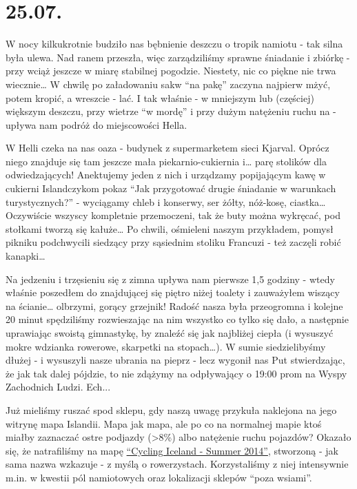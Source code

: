 \chapter{25.07.}

W nocy kilkukrotnie budziło nas bębnienie deszczu o tropik namiotu - tak silna była ulewa. Nad ranem przeszła, więc zarządziliśmy sprawne śniadanie i zbiórkę - przy wciąż jeszcze w miarę stabilnej pogodzie. Niestety, nic co piękne nie trwa wiecznie… W chwilę po załadowaniu sakw “na pakę” zaczyna najpierw mżyć, potem kropić, a wreszcie - lać. I tak właśnie - w mniejszym lub (częściej) większym deszczu, przy wietrze “w mordę” i przy dużym natężeniu ruchu na  - upływa nam podróż do miejscowości Hella.

W Helli czeka na nas oaza - budynek z supermarketem sieci Kjarval. Oprócz niego znajduje się tam jeszcze mała piekarnio-cukiernia i… parę stolików dla odwiedzających! Anektujemy jeden z nich i urządzamy popijającym kawę w cukierni Islandczykom pokaz “Jak przygotować drugie śniadanie w warunkach turystycznych?” - wyciągamy chleb i konserwy, ser żółty, nóż-kosę, ciastka… Oczywiście wszyscy kompletnie przemoczeni, tak że buty można wykręcać, pod stołkami tworzą się kałuże… Po chwili, ośmieleni naszym przykładem, pomysł pikniku podchwycili siedzący przy sąsiednim stoliku Francuzi - też zaczęli robić kanapki…

Na jedzeniu i trzęsieniu się z zimna upływa nam pierwsze 1,5 godziny - wtedy właśnie poszedłem do znajdującej się piętro niżej toalety i zauważyłem wiszący na ścianie… olbrzymi, gorący grzejnik! Radość nasza była przeogromna i kolejne 20 minut spędziliśmy rozwieszając na nim wszystko co tylko się dało, a następnie uprawiając swoistą gimnastykę, by znaleźć się jak najbliżej ciepła (i wysuszyć mokre wdzianka rowerowe, skarpetki na stopach…). W sumie siedzielibyśmy dłużej - i wysuszyli nasze ubrania na pieprz - lecz wygonił nas Put stwierdzając, że jak tak dalej pójdzie, to nie zdążymy na odpływający o 19:00 prom na Wyspy Zachodnich Ludzi. Ech...


Już mieliśmy ruszać spod sklepu, gdy naszą uwagę przykuła naklejona na jego witrynę mapa Islandii. Mapa jak mapa, ale po co na normalnej mapie ktoś miałby zaznaczać ostre podjazdy (>8\%) albo natężenie ruchu pojazdów? Okazało się, że natrafiliśmy na mapę \href{http://www.vegagerdin.is/media/upplysingar-og-utgafa/Cycling-map.pdf}{“Cycling Iceland - Summer 2014”}, stworzoną - jak sama nazwa wzkazuje - z myślą o rowerzystach. Korzystaliśmy z niej intensywnie m.in. w kwestii pól namiotowych oraz lokalizacji sklepów “poza wsiami”.

